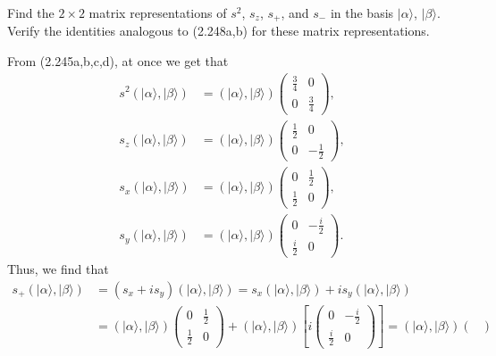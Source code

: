 \documentclass[a4paper]{book}
\newcounter{exercise}[chapter]
\newcounter{solution}[chapter]
\begin{document}
	\begin{exercise}
	Find the $2 \times 2$ matrix representations of $s^2$, $s_z$, $s_+$, and $s_-$ in the basis $|\alpha\rangle$, $|\beta\rangle$. Verify the identities analogous to (2.248a,b) for these matrix representations.
	\end{exercise}
	
	\begin{solution}
	
	From (2.245a,b,c,d), at once we get that
	\begin{align*}
		s^2 ( | \alpha \rangle , | \beta \rangle ) &= ( | \alpha \rangle , | \beta \rangle )	\begin{pmatrix}
		\frac{3}{4} & 0 \\ 0 & \frac{3}{4}
		\end{pmatrix} , \\
		s_z ( | \alpha \rangle , | \beta \rangle ) &= ( | \alpha \rangle , | \beta \rangle )	\begin{pmatrix}
		\frac{1}{2} & 0 \\ 0 & -\frac{1}{2}
		\end{pmatrix} , \\
		s_x ( | \alpha \rangle , | \beta \rangle ) &= ( | \alpha \rangle , | \beta \rangle )	\begin{pmatrix}
		0 & \frac{1}{2} \\ \frac{1}{2} & 0
		\end{pmatrix} , \\
		s_y ( | \alpha \rangle , | \beta \rangle ) &= ( | \alpha \rangle , | \beta \rangle )	\begin{pmatrix}
		0 & -\frac{i}{2} \\ \frac{i}{2} & 0
		\end{pmatrix} .
	\end{align*}
	Thus, we find that
	\begin{align*}
		s_+ ( | \alpha \rangle , | \beta \rangle ) &= ( s_x + i s_y ) ( | \alpha \rangle , | \beta \rangle ) = s_x ( | \alpha \rangle , | \beta \rangle ) + i s_y ( | \alpha \rangle , | \beta \rangle ) \\
		&= ( | \alpha \rangle , | \beta \rangle )	\begin{pmatrix}
		0 & \frac{1}{2} \\ \frac{1}{2} & 0
		\end{pmatrix} + ( | \alpha \rangle , | \beta \rangle )	\left[ i \begin{pmatrix}
		0 & -\frac{i}{2} \\ \frac{i}{2} & 0
		\end{pmatrix} \right] = ( | \alpha \rangle , | \beta \rangle )	\begin{pmatrix}

\end{pmatrix}
\end{align*}
\end{solution}
\end{document}
